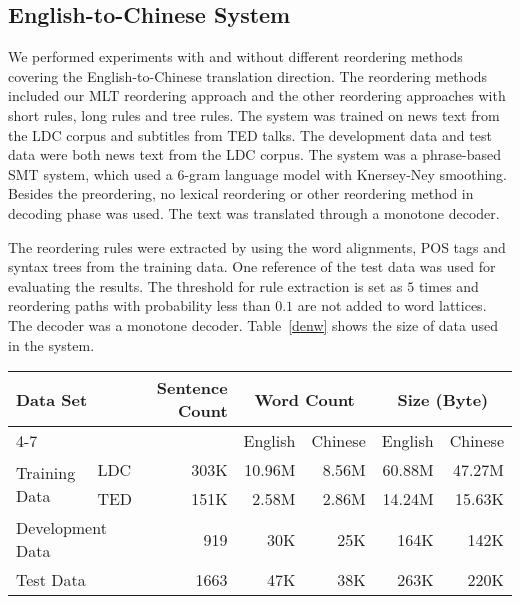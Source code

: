 \documentclass[a4paper]{article}
\begin{document}
\subsection{English-to-Chinese System}

We performed experiments with and without different reordering methods covering the English-to-Chinese translation direction. The reordering methods included our MLT reordering approach and the other reordering approaches with short rules, long rules and tree rules. The system was trained on news text from the LDC corpus and subtitles from TED talks. The development data and test data were both news text from the LDC corpus. The system was a phrase-based SMT system, which used a $6$-gram language model with Knersey-Ney smoothing. Besides the preordering, no lexical reordering or other reordering method in decoding phase was used. The text was translated through a monotone decoder.

The reordering rules were extracted by using the word alignments, POS tags and syntax trees from the training data. One reference of the test data was used for evaluating the results. The threshold for rule extraction is set as $5$ times and reordering paths with probability less than $0.1$ are not added to word lattices. The decoder was a monotone decoder. Table~\ref{denw} shows the size of data used in the system.

\begin{table*}
\centering
\begin{tabular}{|ll|r|r|r|r|r|}
\hline
\multicolumn{2}{|l|}{\multirow{2}{*}{Data Set}} & \multirow{2}{*}{Sentence Count} & \multicolumn{2}{c|}{Word Count} & \multicolumn{2}{c|}{Size (Byte)}\\ \cline{4-7}
& & & English & Chinese & English & Chinese \\
\hline
\multirow{2}{*}{Training Data} & \multicolumn{1}{|l|}{LDC} & 303K & 10.96M & 8.56M & 60.88M & 47.27M \\ \cline{2-7}
& \multicolumn{1}{|l|}{TED} & 151K & 2.58M & 2.86M & 14.24M & 15.63K \\ \hline
\multicolumn{2}{|l|}{Development Data} & 919 & 30K & 25K & 164K & 142K \\ \hline
\multicolumn{2}{|l|}{Test Data} & 1663 & 47K & 38K & 263K & 220K \\ \hline
\end{tabular}
\caption{Corpus statistics in the English-to-Chinese system}
\label{denw}
\end{table*}
\end{document}
